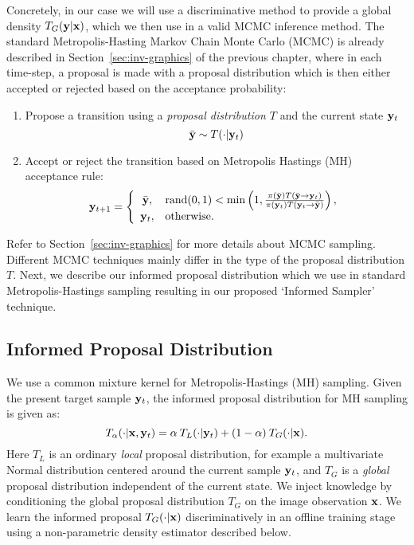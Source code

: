 Concretely, in our case we will use a discriminative method to provide a
global density $T_G(\mathbf{y}|\mathbf{x})$,
which we then use in a valid MCMC inference method.
The standard Metropolis-Hasting Markov Chain Monte Carlo (MCMC) is already
described in Section~\ref{sec:inv-graphics} of the previous chapter, where
in each time-step, a proposal is made with a proposal distribution which
is then either accepted or rejected based on the acceptance probability:

\begin{enumerate}
\item Propose a transition using a \textit{proposal distribution $T$}
  and the current state $\mathbf{y}_t$
\begin{equation*}
\bar{\mathbf{y}} \sim T(\cdot|\mathbf{y}_t)
\end{equation*}
\item Accept or reject the transition based on Metropolis Hastings (MH) acceptance rule:
\begin{equation*}
\mathbf{y}_{t+1} = \left\{
  \begin{array}{cl}
      \bar{\mathbf{y}},  & \textrm{rand}(0,1) < \min\left(1,\frac{\pi(\bar{\mathbf{y}})
T(\bar{\mathbf{y}} \to \mathbf{y}_t)}{\pi(\mathbf{y}_t) T(\mathbf{y}_t \to \bar{\mathbf{y}})} \right), \\
     \mathbf{y}_t, & \textrm{otherwise.}
  \end{array}
\right.
\end{equation*}
\end{enumerate}

Refer to Section~\ref{sec:inv-graphics} for more details about MCMC sampling.
Different MCMC techniques mainly differ in the type of the
proposal distribution $T$. Next, we describe our informed proposal distribution
which we use in standard Metropolis-Hastings sampling resulting in
our proposed `Informed Sampler' technique.

\subsection{Informed Proposal Distribution}
We use a common mixture kernel for Metropolis-Hastings (MH) sampling. Given
the present target sample $\mathbf{y}_t$, the informed proposal distribution
for MH sampling is given as:
%
\begin{equation}
T_{\alpha}(\cdot | \mathbf{x}, \mathbf{y}_t) =
	\alpha \: T_L(\cdot | \mathbf{y}_t) + (1-\alpha) \: T_G(\cdot |
        \mathbf{x}).
\label{eq:proposal}
\end{equation}
%
Here $T_L$ is an ordinary \emph{local} proposal distribution, for example a
multivariate Normal distribution centered around the current sample $\mathbf{y}_t$,
and $T_G$ is a \emph{global} proposal distribution independent
of the current state.
%
We inject knowledge by conditioning the global proposal
distribution $T_G$ on the image observation $\mathbf{x}$.
%
We learn the informed proposal $T_G(\cdot | \mathbf{x})$ discriminatively in an
offline training stage using a non-parametric density estimator described
below.

